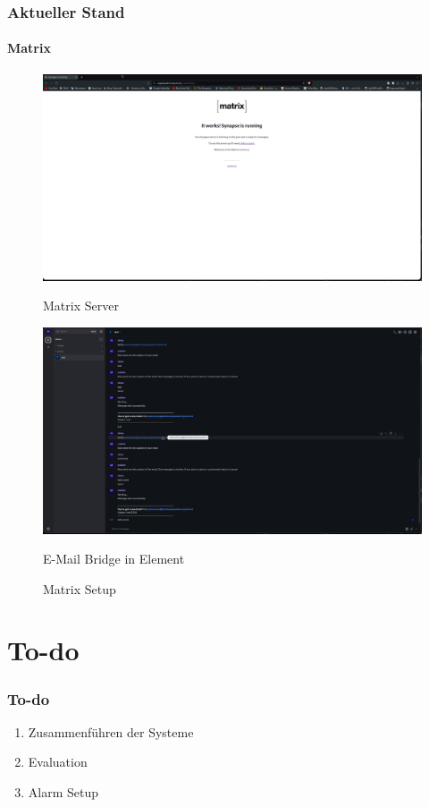 \documentclass[]{beamer}
\begin{document}
\begin{frame}
	\frametitle{Aktueller Stand}
	\framesubtitle{Matrix}
	\begin{figure}
		\centering
		\begin{minipage}[t]{0.45\textwidth}
			\centering
			\includegraphics[width=\textwidth]{Images/Matrix_2.png}
			\caption*{Matrix Server}
		\end{minipage}
		\hfill
		\begin{minipage}[t]{0.45\textwidth}
			\centering
			\includegraphics[width=\textwidth]{Images/Matrix.png}
			\caption*{E-Mail Bridge in Element}
		\end{minipage}
		\hfill
		\caption{Matrix Setup}
		\label{fig:Matrix}
	\end{figure}
\end{frame}


\section{To-do}
\begin{frame}
	\frametitle{To-do}
	\begin{enumerate}
		\item Zusammenführen der Systeme
		\item Evaluation
		\item Alarm Setup
	\end{enumerate}
\end{frame}
\end{document}
